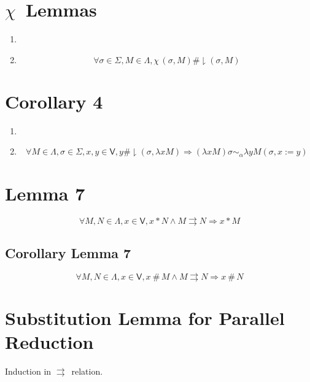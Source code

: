 \documentclass{article}
\newcommand{\restfresh}[3]{\ensuremath{#1 \mathbin{\#\!\!\downharpoonright} (#2,#3)}}
\newcommand{\Var}{\ensuremath{\mathsf{V}}}
\newcommand{\Vars}{\Var}
\newcommand{\Subst}{\ensuremath{\mathsf{\Sigma}}}
\newcommand{\freer}[2]{\ensuremath{#1 *#2}}
\newcommand{\freshr}[2]{\ensuremath{#1\ \#\,#2}}
\newcommand{\alpeq}{\ensuremath{\sim_{\alpha}}}
\newcommand{\upd}[3]{\ensuremath{#1, #2 := #3}}
\newcommand{\choice}[1]{\ensuremath{\chi\,#1}}
\begin{document}
\section{$\chi$\ Lemmas}

\begin{enumerate}
\item 
\item \[\forall \sigma \in \Subst, M \in \Lambda, \restfresh{\choice{(\sigma,M)}}{\sigma}{M}\]
\end{enumerate}

\section{Corollary 4}
\begin{enumerate}
\item 
\item 
\[ \forall M \in \Lambda,\sigma \in \Subst, x,y \in \Var, \restfresh{y}{\sigma}{\lambda x M} \Rightarrow (\lambda x M) \sigma \alpeq \lambda y  M(\upd{\sigma}{x}{y})   \]
\end{enumerate}

\section{Lemma 7}

\[ \forall M,N \in \Lambda, x \in \Vars, \freer{x}{N} \wedge M \rightrightarrows N \Rightarrow \freer{x}{M} \]

\subsection{Corollary Lemma 7}

\[ \forall M,N \in \Lambda, x \in \Vars, \freshr{x}{M} \wedge M \rightrightarrows N \Rightarrow \freshr{x}{N} \]

\section{Substitution Lemma for Parallel Reduction}

Induction in $\rightrightarrows$\ relation.
\end{document}
